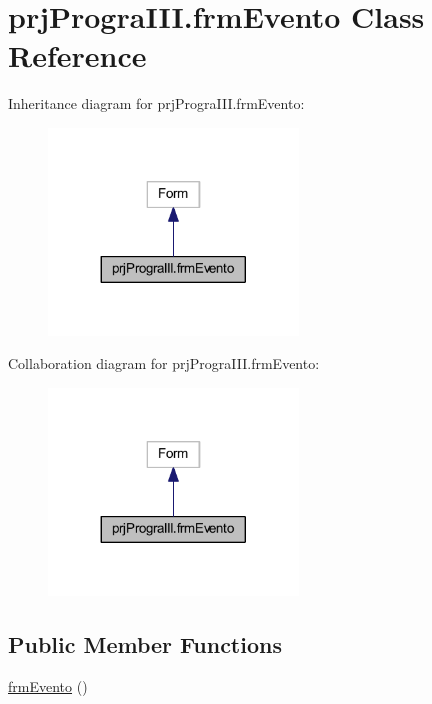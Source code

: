 \hypertarget{classprj_progra_i_i_i_1_1frm_evento}{}\section{prj\+Progra\+I\+I\+I.\+frm\+Evento Class Reference}
\label{classprj_progra_i_i_i_1_1frm_evento}


Inheritance diagram for prj\+Progra\+I\+I\+I.\+frm\+Evento\+:
\nopagebreak
\begin{figure}[H]
\begin{center}
\leavevmode
\includegraphics[width=188pt]{classprj_progra_i_i_i_1_1frm_evento__inherit__graph}
\end{center}
\end{figure}


Collaboration diagram for prj\+Progra\+I\+I\+I.\+frm\+Evento\+:
\nopagebreak
\begin{figure}[H]
\begin{center}
\leavevmode
\includegraphics[width=188pt]{classprj_progra_i_i_i_1_1frm_evento__coll__graph}
\end{center}
\end{figure}
\subsection*{Public Member Functions}
\begin{DoxyCompactItemize}
\item 
\hyperlink{classprj_progra_i_i_i_1_1frm_evento_a225e472e6e6ff9d1741b262137bd9c83}{frm\+Evento} ()
\end{DoxyCompactItemize}
